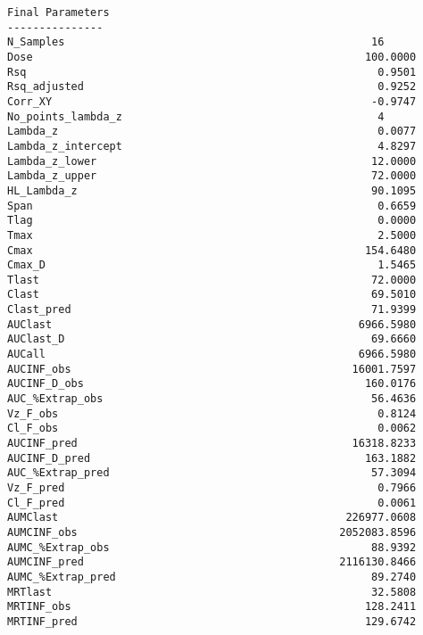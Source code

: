\documentclass[12pt,a4paper]{article}
\begin{document}
\begin{verbatim}
Final Parameters
---------------
N_Samples                                                16
Dose                                                    100.0000
Rsq                                                       0.9501
Rsq_adjusted                                              0.9252
Corr_XY                                                  -0.9747
No_points_lambda_z                                        4
Lambda_z                                                  0.0077
Lambda_z_intercept                                        4.8297
Lambda_z_lower                                           12.0000
Lambda_z_upper                                           72.0000
HL_Lambda_z                                              90.1095
Span                                                      0.6659
Tlag                                                      0.0000
Tmax                                                      2.5000
Cmax                                                    154.6480
Cmax_D                                                    1.5465
Tlast                                                    72.0000
Clast                                                    69.5010
Clast_pred                                               71.9399
AUClast                                                6966.5980
AUClast_D                                                69.6660
AUCall                                                 6966.5980
AUCINF_obs                                            16001.7597
AUCINF_D_obs                                            160.0176
AUC_%Extrap_obs                                          56.4636
Vz_F_obs                                                  0.8124
Cl_F_obs                                                  0.0062
AUCINF_pred                                           16318.8233
AUCINF_D_pred                                           163.1882
AUC_%Extrap_pred                                         57.3094
Vz_F_pred                                                 0.7966
Cl_F_pred                                                 0.0061
AUMClast                                             226977.0608
AUMCINF_obs                                         2052083.8596
AUMC_%Extrap_obs                                         88.9392
AUMCINF_pred                                        2116130.8466
AUMC_%Extrap_pred                                        89.2740
MRTlast                                                  32.5808
MRTINF_obs                                              128.2411
MRTINF_pred                                             129.6742




\end{verbatim}
\end{document}
